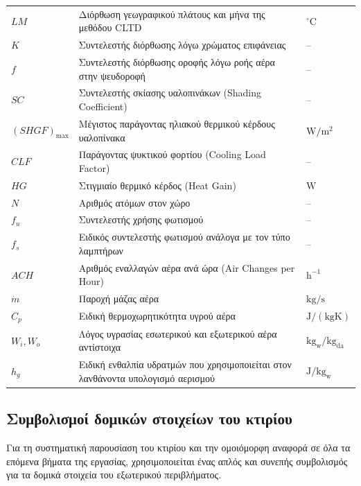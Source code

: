 \documentclass[12pt,a4paper]{article}
\begin{document}
\begin{table}[H]
\begin{tabularx}{\textwidth}{C{2.2cm} L C{2.8cm}}
\(LM\) & Διόρθωση γεωγραφικού πλάτους και μήνα της μεθόδου CLTD & \({}^\circ\mathrm{C}\) \\
\(K\) & Συντελεστής διόρθωσης λόγω χρώματος επιφάνειας & -- \\
\(f\) & Συντελεστής διόρθωσης οροφής λόγω ροής αέρα στην ψευδοροφή & -- \\
\(SC\) & Συντελεστής σκίασης υαλοπινάκων (\textenglish{Shading Coefficient}) & -- \\
\((SHGF)_{\max}\) & Μέγιστος παράγοντας ηλιακού θερμικού κέρδους υαλοπίνακα & \(\mathrm{W/m^2}\) \\
\(CLF\) & Παράγοντας ψυκτικού φορτίου (\textenglish{Cooling Load Factor}) & -- \\
\(HG\) & Στιγμιαίο θερμικό κέρδος (\textenglish{Heat Gain}) & \(\mathrm{W}\) \\
\(N\) & Αριθμός ατόμων στον χώρο & -- \\
\(f_u\) & Συντελεστής χρήσης φωτισμού & -- \\
\(f_s\) & Ειδικός συντελεστής φωτισμού ανάλογα με τον τύπο λαμπτήρων & -- \\
\(ACH\) & Αριθμός εναλλαγών αέρα ανά ώρα (\textenglish{Air Changes per Hour}) & \(\mathrm{h^{-1}}\) \\
\(\dot{m}\) & Παροχή μάζας αέρα & \(\mathrm{kg/s}\) \\
\(C_p\) & Ειδική θερμοχωρητικότητα υγρού αέρα & \(\mathrm{J/(kgK)}\) \\
\(W_i, W_o\) & Λόγος υγρασίας εσωτερικού και εξωτερικού αέρα αντίστοιχα & \(\mathrm{kg_w/kg_{da}}\) \\
\(h_g\) & Ειδική ενθαλπία υδρατμών που χρησιμοποιείται στον λανθάνοντα υπολογισμό αερισμού & \(\mathrm{J/kg_w}\) \\
\bottomrule
\end{tabularx}
\end{table}

\subsection{Συμβολισμοί δομικών στοιχείων του κτιρίου}

Για τη συστηματική παρουσίαση του κτιρίου και την ομοιόμορφη αναφορά σε όλα τα επόμενα
βήματα της εργασίας, χρησιμοποιείται ένας απλός και συνεπής συμβολισμός για τα
δομικά στοιχεία του εξωτερικού περιβλήματος.
\end{document}
